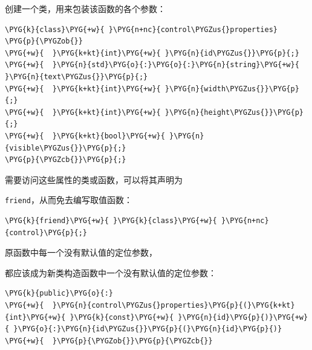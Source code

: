 创建一个类，用来包装该函数的各个参数：



\begin{codeblockbg}
\begin{Verbatim}[commandchars=\\\{\},breaklines=true,breakanywhere=true,fontsize=\codefont,xleftmargin=17bp]
\PYG{k}{class}\PYG{+w}{ }\PYG{n+nc}{control\PYGZus{}properties}
\PYG{p}{\PYGZob{}}
\PYG{+w}{  }\PYG{k+kt}{int}\PYG{+w}{ }\PYG{n}{id\PYGZus{}}\PYG{p}{;}
\PYG{+w}{  }\PYG{n}{std}\PYG{o}{:}\PYG{o}{:}\PYG{n}{string}\PYG{+w}{ }\PYG{n}{text\PYGZus{}}\PYG{p}{;}
\PYG{+w}{  }\PYG{k+kt}{int}\PYG{+w}{ }\PYG{n}{width\PYGZus{}}\PYG{p}{;}
\PYG{+w}{  }\PYG{k+kt}{int}\PYG{+w}{ }\PYG{n}{height\PYGZus{}}\PYG{p}{;}
\PYG{+w}{  }\PYG{k+kt}{bool}\PYG{+w}{ }\PYG{n}{visible\PYGZus{}}\PYG{p}{;}
\PYG{p}{\PYGZcb{}}\PYG{p}{;}
\end{Verbatim}
\end{codeblockbg}



需要访问这些属性的类或函数，可以将其声明为



\texttt{friend}，从而免去编写取值函数：



\begin{codeblockbg}
\begin{Verbatim}[commandchars=\\\{\},breaklines=true,breakanywhere=true,fontsize=\codefont,xleftmargin=17bp]
\PYG{k}{friend}\PYG{+w}{ }\PYG{k}{class}\PYG{+w}{ }\PYG{n+nc}{control}\PYG{p}{;}
\end{Verbatim}
\end{codeblockbg}



原函数中每一个没有默认值的定位参数，



都应该成为新类构造函数中一个没有默认值的定位参数：



\begin{codeblockbg}
\begin{Verbatim}[commandchars=\\\{\},breaklines=true,breakanywhere=true,fontsize=\codefont,xleftmargin=17bp]
\PYG{k}{public}\PYG{o}{:}
\PYG{+w}{  }\PYG{n}{control\PYGZus{}properties}\PYG{p}{(}\PYG{k+kt}{int}\PYG{+w}{ }\PYG{k}{const}\PYG{+w}{ }\PYG{n}{id}\PYG{p}{)}\PYG{+w}{ }\PYG{o}{:}\PYG{n}{id\PYGZus{}}\PYG{p}{(}\PYG{n}{id}\PYG{p}{)}
\PYG{+w}{  }\PYG{p}{\PYGZob{}}\PYG{p}{\PYGZcb{}}
\end{Verbatim}
\end{codeblockbg}


